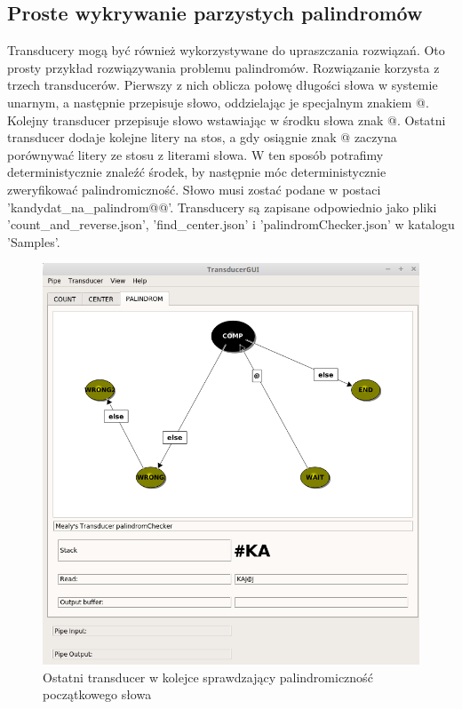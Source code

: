 \documentclass[declaration,shortabstract]{iithesis}
\theoremstyle{definition}
\theoremstyle{plain}
\begin{document}
\subsection{Proste wykrywanie parzystych palindromów}
\label{parz_pal}
Transducery mogą być również wykorzystywane do upraszczania rozwiązań. Oto prosty przykład rozwiązywania problemu palindromów. Rozwiązanie korzysta z trzech transducerów. Pierwszy z nich oblicza połowę długości słowa w systemie unarnym, a następnie przepisuje słowo, oddzielając je specjalnym znakiem @. Kolejny transducer przepisuje słowo wstawiając w środku słowa znak @. Ostatni transducer dodaje kolejne litery na stos, a gdy osiągnie znak @ zaczyna porównywać litery ze stosu z literami słowa. W ten sposób potrafimy deterministycznie znaleźć środek, by następnie móc deterministycznie zweryfikować palindromiczność. Słowo musi zostać podane w postaci 'kandydat\_na\_palindrom@@'. Transducery są zapisane odpowiednio jako pliki 'count\_and\_reverse.json', 'find\_center.json' i 'palindromChecker.json' w katalogu 'Samples'.
\begin{figure}[h]
\centering
\includegraphics[width=\textwidth]{palindrom.png}
\caption{Ostatni transducer w kolejce sprawdzający palindromiczność początkowego słowa}
\label{fig:palindrom}
\end{figure}
\end{document}
